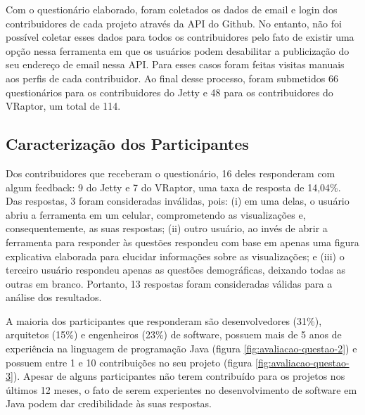 Com o questionário elaborado, foram coletados os dados de email e login dos contribuidores de cada projeto através da API do Github. No entanto, não foi possível coletar esses dados para todos os contribuidores pelo fato de existir uma opção nessa ferramenta em que os usuários podem desabilitar a publicização do seu endereço de email nessa API. Para esses casos foram feitas visitas manuais aos perfis de cada contribuidor. Ao final desse processo, foram submetidos 66 questionários para os contribuidores do Jetty e 48 para os contribuidores do VRaptor, um total de 114.

\subsection{Caracterização dos Participantes} \label{subsec:avaliacao-caracterizacao-participantes}

Dos contribuidores que receberam o questionário, 16 deles responderam com algum feedback: 9 do Jetty e 7 do VRaptor, uma taxa de resposta de 14,04\%. Das respostas, 3 foram consideradas inválidas, pois: (i) em uma delas, o usuário abriu a ferramenta em um celular, comprometendo as visualizações e, consequentemente, as suas respostas; (ii) outro usuário, ao invés de abrir a ferramenta para responder às questões respondeu com base em apenas uma figura explicativa elaborada para elucidar informações sobre as visualizações; e (iii) o terceiro usuário respondeu apenas as questões demográficas, deixando todas as outras em branco. Portanto, 13 respostas foram consideradas válidas para a análise dos resultados.

A maioria dos participantes que responderam são desenvolvedores (31\%), arquitetos (15\%) e engenheiros (23\%) de software, possuem mais de 5 anos de experiência na linguagem de programação Java (figura \ref{fig:avaliacao-questao-2}) e possuem entre 1 e 10 contribuições no seu projeto (figura \ref{fig:avaliacao-questao-3}). Apesar de alguns participantes não terem contribuído para os projetos nos últimos 12 meses, o fato de serem experientes no desenvolvimento de software em Java podem dar credibilidade às suas respostas.

